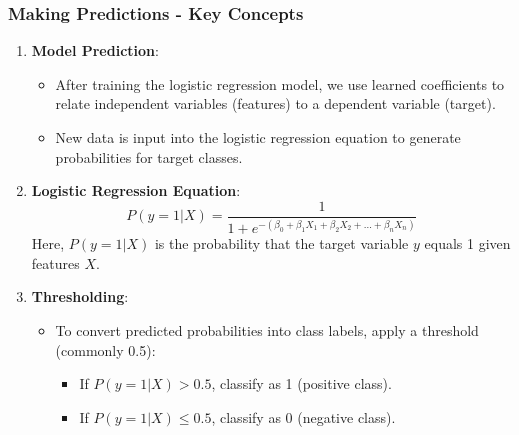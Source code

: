\documentclass[aspectratio=169]{beamer}
\begin{document}
\begin{frame}[fragile]
  \frametitle{Making Predictions - Key Concepts}
  \begin{enumerate}
    \item \textbf{Model Prediction}:
      \begin{itemize}
        \item After training the logistic regression model, we use learned coefficients to relate independent variables (features) to a dependent variable (target).
        \item New data is input into the logistic regression equation to generate probabilities for target classes.
      \end{itemize}

    \item \textbf{Logistic Regression Equation}:
      \begin{equation}
        P(y=1 | X) = \frac{1}{1 + e^{-(\beta_0 + \beta_1 X_1 + \beta_2 X_2 + ... + \beta_n X_n)}}
      \end{equation}
      Here, \( P(y=1 | X) \) is the probability that the target variable \( y \) equals 1 given features \( X \).

    \item \textbf{Thresholding}:
      \begin{itemize}
        \item To convert predicted probabilities into class labels, apply a threshold (commonly 0.5):
        \begin{itemize}
          \item If \( P(y=1 | X) > 0.5 \), classify as 1 (positive class).
          \item If \( P(y=1 | X) \leq 0.5 \), classify as 0 (negative class).
        \end{itemize}
      \end{itemize}

  \end{enumerate}
\end{frame}
\end{document}
